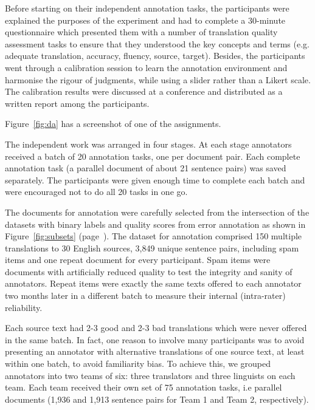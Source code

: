 Before starting on their independent annotation tasks, the participants were explained the purposes of the experiment and had to complete a 30-minute questionnaire which presented them with a number of translation quality assessment tasks to ensure that they understood the key concepts and terms (e.g. adequate translation, accuracy, fluency, source, target).
Besides, the participants went through a calibration session to learn the annotation environment and harmonise the rigour of judgments, while using a slider rather than a Likert scale. 
The calibration results were discussed at a conference and distributed as a written report among the participants.

Figure~\ref{fig:da} has a screenshot of one of the assignments.


The independent work was arranged in four stages. At each stage annotators received a batch of 20 annotation tasks, one per document pair. Each complete annotation task (a parallel document of about 21 sentence pairs) was saved separately. The participants were given enough time to complete each batch and were encouraged not to do all 20 tasks in one go.

\label{pg:intersection140}
The documents for annotation were carefully selected from the intersection of the datasets with binary labels and quality scores from error annotation as shown in Figure~\ref{fig:subsets} (page~\pageref{pg:subsets}). The dataset for annotation comprised 150 multiple translations to 30 English sources, 3,849 unique sentence pairs, including spam items and one repeat document for every participant. 
Spam items were documents with artificially reduced quality to test the integrity and sanity of annotators. Repeat items were exactly the same texts offered to each annotator two months later in a different batch to measure their internal (intra-rater) reliability.

Each source text had 2-3 good and 2-3 bad translations which were never offered in the same batch. In fact, one reason to involve many participants was to avoid presenting an annotator with alternative translations of one source text, at least within one batch, to avoid familiarity bias. To achieve this, we grouped annotators into two teams of six: three translators and three linguists on each team. Each team received their own set of 75 annotation tasks, i.e parallel documents (1,936 and 1,913 sentence pairs for Team 1 and Team 2, respectively). 


